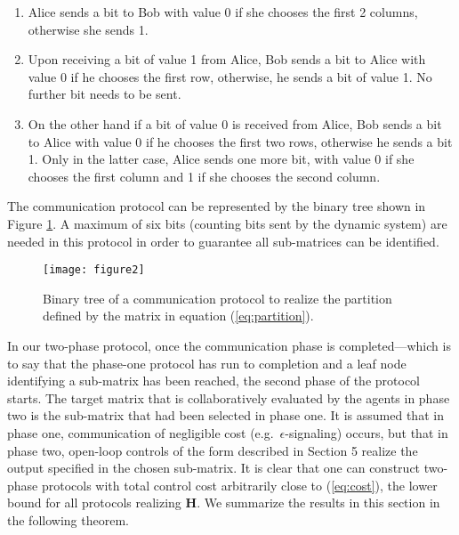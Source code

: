 \documentclass[12pt,onecolumn,draftcls]{IEEEtran}
\newcommand{\bH}{\mathbf{H}}
\begin{document}
\begin{enumerate}
\item Alice sends a bit to Bob with value 0 if she chooses the first 2 columns, otherwise she sends 1.
\item Upon receiving a bit of value 1 from Alice, Bob sends a bit to Alice with value 0 if he chooses
the first row, otherwise, he sends a bit of value 1.  No further bit needs to be sent.
\item On the other hand if a bit of value 0 is received from Alice, Bob sends a bit to Alice with
value 0 if he chooses the first two rows, otherwise he sends a bit 1.  Only in the latter case, Alice sends
one more bit, with value 0 if she chooses the first column and 1 if she chooses the second column.
\end{enumerate}

The communication protocol can be represented by the binary tree shown in Figure \ref{fig1}.
A maximum of six bits (counting bits sent by the dynamic system) are needed in this protocol
in order to guarantee all sub-matrices can be identified. 

\begin{figure}[h] \begin{center}
\vspace{-.1cm}
\texttt{[image: figure2]} 
\vspace{-0.8cm}
\caption{Binary tree of a communication protocol to realize the partition
defined by the matrix in equation (\ref{eq:partition}).}  \label{fig1}
\end{center}
\end{figure}

In our two-phase protocol, once the communication phase is completed---which is to say that the phase-one protocol has run to completion and a leaf node identifying a sub-matrix has been reached, the second phase of the protocol starts.  The target matrix that is collaboratively evaluated by the agents in phase two is the sub-matrix that had been selected in phase one.  It is assumed that in phase one, communication of negligible cost (e.g.\ $\epsilon$-signaling) occurs, but that in phase two, open-loop controls of the form described in Section 5 realize the output specified in the chosen sub-matrix.
It is clear that one can construct two-phase protocols with total control cost arbitrarily
close to (\ref{eq:cost}), the lower bound for all protocols realizing $\bH$.		
We summarize the results in this section in the following theorem.
\end{document}
